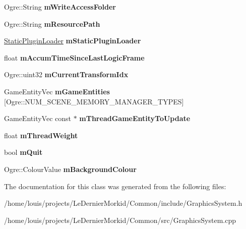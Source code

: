 \begin{DoxyCompactItemize}
Ogre\+::\+String {\bfseries m\+Write\+Access\+Folder}
\item 
\mbox{\label{class_common_1_1_graphics_system_ad6c40d2244340da36c0a7853dc891196}} 
Ogre\+::\+String {\bfseries m\+Resource\+Path}
\item 
\mbox{\label{class_common_1_1_graphics_system_a94edce8cb6c70b67a66ea65a4c989fce}} 
\hyperlink{class_common_1_1_static_plugin_loader}{Static\+Plugin\+Loader} {\bfseries m\+Static\+Plugin\+Loader}
\item 
\mbox{\label{class_common_1_1_graphics_system_ad8f0298ee17a2331e0e6406e16e6cd23}} 
float {\bfseries m\+Accum\+Time\+Since\+Last\+Logic\+Frame}
\item 
\mbox{\label{class_common_1_1_graphics_system_a2a3acd30c5c38530b9b07f0b3a2dbce5}} 
Ogre\+::uint32 {\bfseries m\+Current\+Transform\+Idx}
\item 
\mbox{\label{class_common_1_1_graphics_system_a39c347647fabbfb8d86a8e7fc55825bd}} 
Game\+Entity\+Vec {\bfseries m\+Game\+Entities} \mbox{[}Ogre\+::\+N\+U\+M\+\_\+\+S\+C\+E\+N\+E\+\_\+\+M\+E\+M\+O\+R\+Y\+\_\+\+M\+A\+N\+A\+G\+E\+R\+\_\+\+T\+Y\+P\+ES\mbox{]}
\item 
\mbox{\label{class_common_1_1_graphics_system_adaf0d898cd16130084bdf36220f6111b}} 
Game\+Entity\+Vec const  $\ast$ {\bfseries m\+Thread\+Game\+Entity\+To\+Update}
\item 
\mbox{\label{class_common_1_1_graphics_system_a41e916be28a4d889337a4c8c0868b3ed}} 
float {\bfseries m\+Thread\+Weight}
\item 
\mbox{\label{class_common_1_1_graphics_system_a141239a20891b1a980e319a89420f2b0}} 
bool {\bfseries m\+Quit}
\item 
\mbox{\label{class_common_1_1_graphics_system_a64e431c0b8b4a8913e488a845afdc48d}} 
Ogre\+::\+Colour\+Value {\bfseries m\+Background\+Colour}
\end{DoxyCompactItemize}


The documentation for this class was generated from the following files\+:\begin{DoxyCompactItemize}
\item 
/home/louis/projects/\+Le\+Dernier\+Morkid/\+Common/include/Graphics\+System.\+h\item 
/home/louis/projects/\+Le\+Dernier\+Morkid/\+Common/src/Graphics\+System.\+cpp\end{DoxyCompactItemize}
